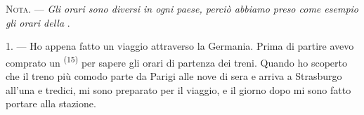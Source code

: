 %
%
%
%
%
%

\VUsaut{4.0mm}
\VUsaut{2.4mm}
\VUsaut{3.4mm}
\textsc{Nota.} --- \textit{Gli orari sono diversi in ogni paese, perciò abbiamo preso
come esempio gli orari della}
.

1. --- Ho appena fatto un viaggio attraverso la Germania. Prima di partire avevo
comprato un  \textsuperscript{(15)} per sapere gli orari di partenza dei
treni. Quando ho scoperto che il treno più comodo parte da Parigi alle nove di sera e
arriva a Strasburgo all'una e tredici, mi sono preparato per il viaggio, e il giorno
dopo mi sono fatto portare alla stazione.

